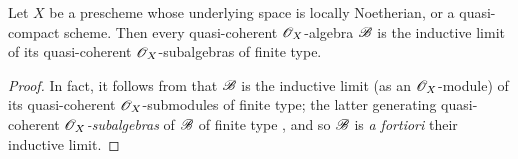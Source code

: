 \begin{proposition}[9.6.6]
\label{I.9.6.6}
Let $X$ be a prescheme whose underlying space is locally Noetherian, or a quasi-compact scheme.
Then every quasi-coherent $\mathscr{O}_X$-algebra $\mathscr{B}$ is the inductive limit of its quasi-coherent $\mathscr{O}_X$-subalgebras of finite type.
\end{proposition}

\begin{proof}
In fact, it follows from  that $\mathscr{B}$ is the inductive limit (as an $\mathscr{O}_X$-module) of its quasi-coherent $\mathscr{O}_X$-submodules of finite type; the latter generating quasi-coherent \emph{$\mathscr{O}_X$-subalgebras} of $\mathscr{B}$ of finite type , and so $\mathscr{B}$ is \emph{a fortiori} their inductive limit.
\end{proof}

